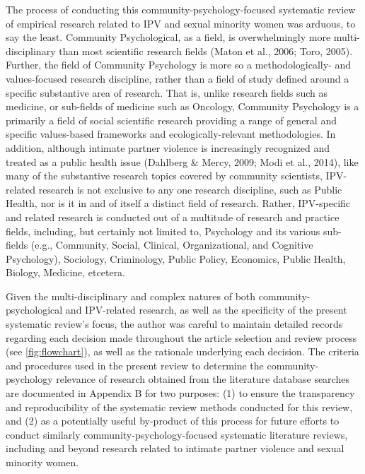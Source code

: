 \documentclass[11pt,]{tufte-book}
\begin{document}
The process of conducting this community-psychology-focused systematic
review of empirical research related to IPV and sexual minority women
was arduous, to say the least. Community Psychological, as a field, is
overwhelmingly more multi-disciplinary than most scientific research
fields (Maton et al., 2006; Toro, 2005). Further, the field of Community
Psychology is more so a methodologically- and values-focused research
discipline, rather than a field of study defined around a specific
substantive area of research. That is, unlike research fields such as
medicine, or sub-fields of medicine such as Oncology, Community
Psychology is a primarily a field of social scientific research
providing a range of general and specific values-based frameworks and
ecologically-relevant methodologies. In addition, although intimate
partner violence is increasingly recognized and treated as a public
health issue (Dahlberg \& Mercy, 2009; Modi et al., 2014), like many of
the substantive research topics covered by community scientists,
IPV-related research is not exclusive to any one research discipline,
such as Public Health, nor is it in and of itself a distinct field of
research. Rather, IPV-specific and related research is conducted out of
a multitude of research and practice fields, including, but certainly
not limited to, Psychology and its various sub-fields (e.g., Community,
Social, Clinical, Organizational, and Cognitive Psychology), Sociology,
Criminology, Public Policy, Economics, Public Health, Biology, Medicine,
etcetera.

Given the multi-disciplinary and complex natures of both
community-psychological and IPV-related research, as well as the
specificity of the present systematic review's focus, the author was
careful to maintain detailed records regarding each decision made
throughout the article selection and review process (see
\cref{fig:flowchart}), as well as the rationale
underlying each decision. The criteria and procedures used in the
present review to determine the community-psychology relevance of
research obtained from the literature database searches are documented
in Appendix B for two purposes: (1) to ensure the transparency and
reproducibility of the systematic review methods conducted for this
review, and (2) as a potentially useful by-product of this process for
future efforts to conduct similarly community-psychology-focused
systematic literature reviews, including and beyond research related to
intimate partner violence and sexual minority women.
\end{document}
